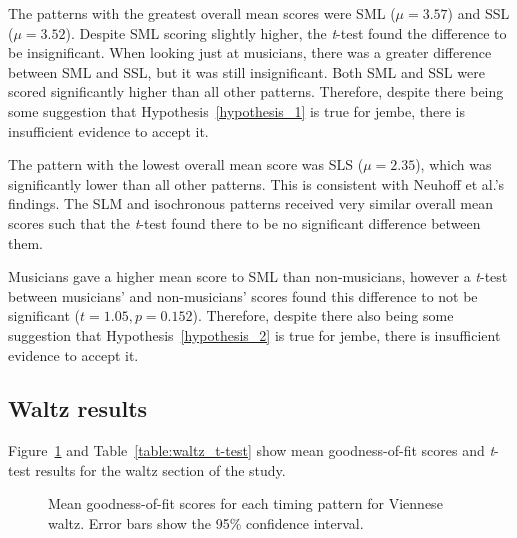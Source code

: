 \documentclass[12pt,twoside,openright]{report}
\begin{document}
The patterns with the greatest overall mean scores were SML ($\mu=3.57$) and SSL
($\mu=3.52$). Despite SML scoring slightly higher, the \textit{t}-test found the difference
to be insignificant. When looking just at musicians, there was a greater
difference between SML and SSL, but it was still insignificant. Both SML and SSL
were scored significantly higher than all other patterns. Therefore, despite
there being some suggestion that Hypothesis~\ref{hypothesis_1} is true for jembe, there is
insufficient evidence to accept it.

The pattern with the lowest overall mean score was SLS ($\mu=2.35$), which was
significantly lower than all other patterns. This is consistent with Neuhoff et
al.'s findings. The SLM and isochronous patterns received very similar overall
mean scores such that the \textit{t}-test found there to be no significant difference
between them.

Musicians gave a higher mean score to SML than non-musicians, however a \textit{t}-test
between musicians' and non-musicians' scores found this difference to not be
significant ($t=1.05, p=0.152$). Therefore, despite there also being some suggestion
that Hypothesis~\ref{hypothesis_2} is true for jembe, there is insufficient evidence to accept it.


\subsection{Waltz results} \label{user_study_waltz_results}

Figure~\ref{fig:waltz_bar_charts} and Table~\ref{table:waltz_t-test} show mean goodness-of-fit scores and \textit{t}-test results for the
waltz section of the study.

\begin{figure}[ht]
    \centering
    \caption{Mean goodness-of-fit scores for each timing pattern for Viennese waltz. Error bars show the 95\% confidence interval.}
    \label{fig:waltz_bar_charts}
\end{figure}
\end{document}

